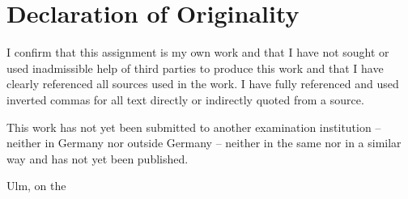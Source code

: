 \documentclass[BCOR20mm,DIV14,10pt,headinclude,footexclude,bibtotoc,liststotoc]{article}
\begin{document}



\cleardoublepage
\section*{Declaration of Originality}

I confirm that this assignment is my own work and that I have not sought or used
inadmissible help of third parties to produce this work and that I have clearly
referenced all sources used in the work. I have fully referenced and used
inverted commas for all text directly or indirectly quoted from a source.

This work has not yet been submitted to another examination institution –
neither in Germany nor outside Germany – neither in the same nor in a similar
way and has not yet been published.

\vspace{2cm}

Ulm, on the \dotfill

\hspace{10cm} {\footnotesize \theauthor}
\end{document}
